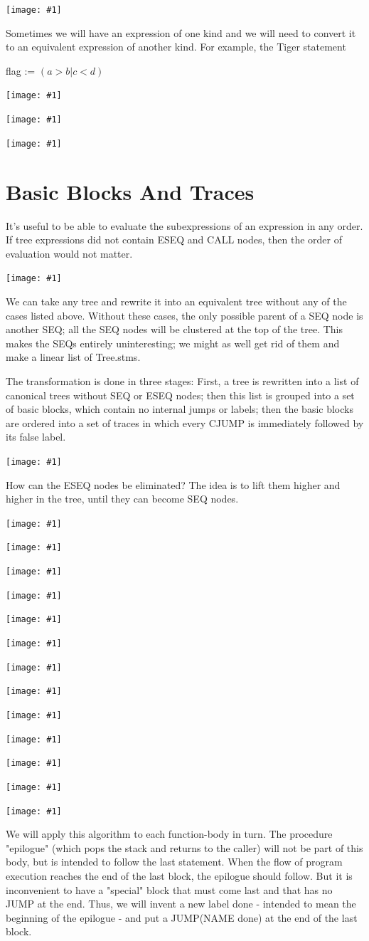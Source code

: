 \documentclass[8pt, a4paper, oneside, twocolumn]{extarticle}
\newcommand{\ph}[1]{
    \texttt{[image: \#1]}
}
\begin{document}
\ph{ir6}

Sometimes we will have an expression of one kind and we will need to
convert it to an equivalent expression of another kind. For example, the Tiger
statement

flag := $(a>b \vert c<d)$

\ph{ir7}

\ph{ir8}

\ph{ir9}

\section{Basic Blocks And Traces}
It's useful to be able to evaluate the subexpressions of an 
expression in any order. If tree expressions did not contain ESEQ and CALL nodes,
then the order of evaluation would not matter.

\ph{81}

We can take any tree and rewrite it into an equivalent tree without any of
the cases listed above. Without these cases, the only possible parent of a SEQ
node is another SEQ; all the SEQ nodes will be clustered at the top of the tree.
This makes the SEQs entirely uninteresting; we might as well get rid of them
and make a linear list of Tree.stms.

The transformation is done in three stages: First, a tree is rewritten into a
list of canonical trees without SEQ or ESEQ nodes; then this list is grouped
into a set of basic blocks, which contain no internal jumps or labels; then
the basic blocks are ordered into a set of traces in which every CJUMP is
immediately followed by its false label.

\ph{82}

How can the ESEQ nodes be eliminated? The idea is to lift them higher and
higher in the tree, until they can become SEQ nodes.

\ph{83}

\ph{84}

\ph{85}

\ph{86}

\ph{87}

\ph{88}

\ph{89}

\ph{811}

\ph{812}

\ph{813}

\ph{814}

\ph{815}

\ph{816}

We will apply this algorithm to each function-body in turn. The procedure
"epilogue" (which pops the stack and returns to the caller) will not be part of
this body, but is intended to follow the last statement. When the flow of 
program execution reaches the end of the last block, the epilogue should follow.
But it is inconvenient to have a "special" block that must come last and that
has no JUMP at the end. Thus, we will invent a new label done - intended
to mean the beginning of the epilogue - and put a JUMP(NAME done) at the
end of the last block.
\end{document}
